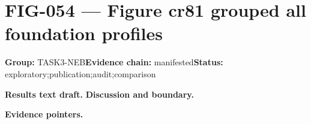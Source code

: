 \clearpage
\section{FIG-054 --- Figure cr81 grouped all foundation profiles}
\label{figpage:fig-054}
\textbf{Group:} TASK3-NEB\quad \textbf{Evidence chain:} manifested\quad \textbf{Status:} exploratory;publication;audit;comparison

\textbf{Results text draft.} 
\textbf{Discussion and boundary.} 


\textbf{Evidence pointers.}



\vfill
